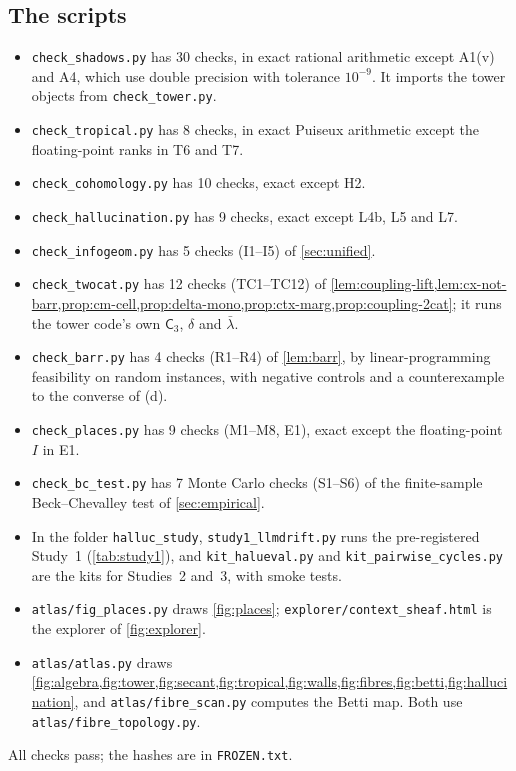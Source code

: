 \documentclass[11pt]{article}
\theoremstyle{definition}
\newcommand{\C}{\mathsf C}
\newcommand{\lb}{\bar\lambda}
\begin{document}
\subsection{The scripts}
\begin{itemize}
\item \texttt{check\_shadows.py} has 30 checks, in exact rational arithmetic except A1(v) and A4, which use double precision with
  tolerance $10^{-9}$. It imports the tower objects from \texttt{check\_tower.py}.
\item \texttt{check\_tropical.py} has 8 checks, in exact Puiseux arithmetic except the floating-point ranks in T6 and T7.
\item \texttt{check\_cohomology.py} has 10 checks, exact except H2.
\item \texttt{check\_hallucination.py} has 9 checks, exact except L4b, L5 and L7.
\item \texttt{check\_infogeom.py} has 5 checks (I1--I5) of \cref{sec:unified}.
\item \texttt{check\_twocat.py} has 12 checks (TC1--TC12) of \cref{lem:coupling-lift,lem:cx-not-barr,prop:cm-cell,prop:delta-mono,prop:ctx-marg,prop:coupling-2cat}; it runs the tower
  code's own $\C_3$, $\delta$ and $\lb$.
\item \texttt{check\_barr.py} has 4 checks (R1--R4) of \cref{lem:barr}, by linear-programming feasibility on random instances, with negative controls and a counterexample to the converse of (d).
\item \texttt{check\_places.py} has 9 checks (M1--M8, E1), exact except the floating-point $I$ in E1.
\item \texttt{check\_bc\_test.py} has 7 Monte Carlo checks (S1--S6) of the finite-sample Beck--Chevalley test of \cref{sec:empirical}.
\item In the folder \texttt{halluc\_study}, \texttt{study1\_llmdrift.py} runs the pre-registered Study~1 (\cref{tab:study1}), and
  \texttt{kit\_halueval.py} and \texttt{kit\_pairwise\_cycles.py} are the kits for Studies~2 and~3, with smoke tests.
\item \texttt{atlas/fig\_places.py} draws \cref{fig:places}; \texttt{explorer/context\_sheaf.html} is the explorer of \cref{fig:explorer}.
\item \texttt{atlas/atlas.py} draws \cref{fig:algebra,fig:tower,fig:secant,fig:tropical,fig:walls,fig:fibres,fig:betti,fig:hallucination}, and
  \texttt{atlas/fibre\_scan.py} computes the Betti map. Both use \texttt{atlas/fibre\_topology.py}.
\end{itemize}
All checks pass; the hashes are in \texttt{FROZEN.txt}.
\end{document}
